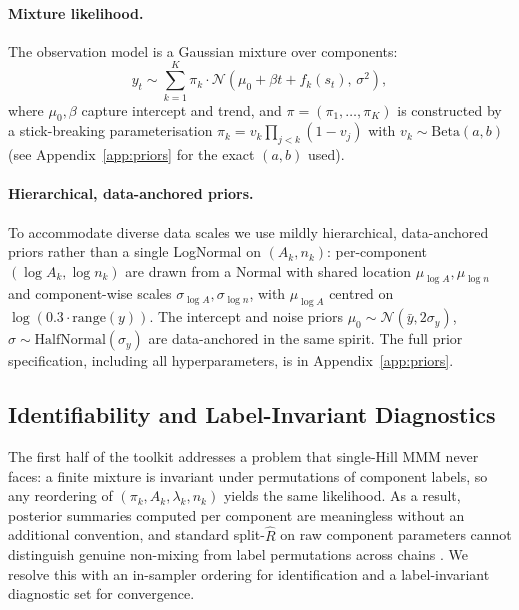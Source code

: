 \documentclass[11pt]{article}
\begin{document}
\paragraph{Mixture likelihood.} The observation model is a Gaussian mixture over components:
\begin{equation}
    y_t \sim \sum_{k=1}^{K} \pi_k \cdot \mathcal{N}\!\left(\mu_0 + \beta t + f_k(s_t),\, \sigma^2\right),
\end{equation}
where $\mu_0, \beta$ capture intercept and trend, and $\pi = (\pi_1, \ldots, \pi_K)$ is constructed by a stick-breaking parameterisation $\pi_k = v_k \prod_{j<k}(1-v_j)$ with $v_k \sim \text{Beta}(a, b)$ (see Appendix~\ref{app:priors} for the exact $(a, b)$ used).

\paragraph{Hierarchical, data-anchored priors.} To accommodate diverse data scales we use mildly hierarchical, data-anchored priors rather than a single LogNormal on $(A_k, n_k)$: per-component $(\log A_k, \log n_k)$ are drawn from a Normal with shared location $\mu_{\log A}, \mu_{\log n}$ and component-wise scales $\sigma_{\log A}, \sigma_{\log n}$, with $\mu_{\log A}$ centred on $\log(0.3 \cdot \text{range}(y))$. The intercept and noise priors $\mu_0 \sim \mathcal{N}(\bar{y}, 2\sigma_y)$, $\sigma \sim \text{HalfNormal}(\sigma_y)$ are data-anchored in the same spirit. The full prior specification, including all hyperparameters, is in Appendix~\ref{app:priors}.

\subsection{Identifiability and Label-Invariant Diagnostics}
\label{sec:identifiability}

The first half of the toolkit addresses a problem that single-Hill MMM never faces: a finite mixture is invariant under permutations of component labels, so any reordering of $(\pi_k, A_k, \lambda_k, n_k)$ yields the same likelihood. As a result, posterior summaries computed per component are meaningless without an additional convention, and standard split-$\widehat{R}$ on raw component parameters cannot distinguish genuine non-mixing from label permutations across chains \citep{stephens2000label, fruhwirth2006finite}. We resolve this with an in-sampler ordering for identification and a label-invariant diagnostic set for convergence.
\end{document}
